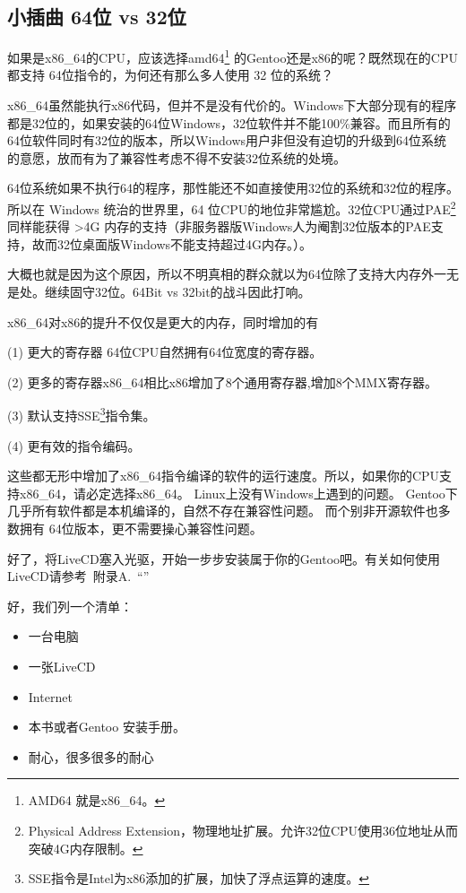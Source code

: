 \documentclass[amstex,twoside]{ctexbook}
\newenvironment{insertnote}{ \ttfamily\CJKfamily{KaiTi} }{\vskip 1cm }
\newcommand{\faqref}[1]{~附录A.\nameref{FAQ}~“\nameref{#1}”}
\begin{document}
\begin{insertnote}
\subsection*{小插曲  64位 vs 32位}

如果是x86\_64的CPU，应该选择amd64\footnote{AMD64 就是x86\_64。}
的Gentoo还是x86的呢？既然现在的CPU都支持 64位指令的，为何还有那么多人使用 32 位的系统？

x86\_64虽然能执行x86代码，但并不是没有代价的。Windows下大部分现有的程序都是32位的，如果安装的64位Windows，32位软件并不能100\%兼容。而且所有的64位软件同时有32位的版本，所以Windows用户非但没有迫切的升级到64位系统的意愿，放而有为了兼容性考虑不得不安装32位系统的处境。

64位系统如果不执行64的程序，那性能还不如直接使用32位的系统和32位的程序。所以在 Windows 统治的世界里，64 位CPU的地位非常尴尬。32位CPU通过PAE\footnote{Physical Address Extension，物理地址扩展。允许32位CPU使用36位地址从而突破4G内存限制。}同样能获得 >4G 内存的支持（非服务器版Windows人为阉割32位版本的PAE支持，故而32位桌面版Windows不能支持超过4G内存。）。

大概也就是因为这个原因，所以不明真相的群众就以为64位除了支持大内存外一无是处。继续固守32位。64Bit vs 32bit的战斗因此打响。

x86\_64对x86的提升不仅仅是更大的内存，同时增加的有

(1)  更大的寄存器 64位CPU自然拥有64位宽度的寄存器。

(2)  更多的寄存器x86\_64相比x86增加了8个通用寄存器,增加8个MMX寄存器。

(3)  默认支持SSE\footnote{SSE指令是Intel为x86添加的扩展，加快了浮点运算的速度。}指令集。

(4)  更有效的指令编码。

这些都无形中增加了x86\_64指令编译的软件的运行速度。所以，如果你的CPU支持x86\_64，请必定选择x86\_64。
Linux上没有Windows上遇到的问题。
Gentoo下几乎所有软件都是本机编译的，自然不存在兼容性问题。
而个别非开源软件也多数拥有 64位版本，更不需要操心兼容性问题。
\end{insertnote}



好了，将LiveCD塞入光驱，开始一步步安装属于你的Gentoo吧。有关如何使用LiveCD请参考\faqref{FAQ:UseLiveCD}

好，我们列一个清单：


\begin{itemize}
\item[ \checked] 一台电脑
\item[ \checked] 一张LiveCD
\item[ \checked] Internet
\item[ \checked] 本书或者Gentoo 安装手册。
\item[ \checked] 耐心，很多很多的耐心
\end{itemize}
\end{document}
